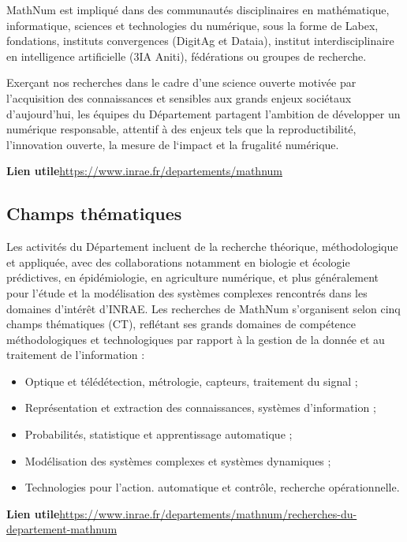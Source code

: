 MathNum est impliqu\'e dans des communaut\'es disciplinaires en math\'ematique, informatique, sciences et technologies du num\'erique, sous la forme de Labex, fondations, instituts convergences (DigitAg et Dataia), institut interdisciplinaire en intelligence artificielle (3IA Aniti), f\'ed\'erations ou groupes de recherche.

Exer\c{c}ant nos recherches dans le cadre d’une science ouverte motiv\'ee par l’acquisition des connaissances et sensibles aux grands enjeux soci\'etaux d’aujourd’hui, les \'equipes du D\'epartement partagent l’ambition de d\'evelopper un num\'erique responsable, attentif \`a des enjeux tels que la reproductibilit\'e, l’innovation ouverte, la mesure de l‘impact et la frugalit\'e num\'erique.

\textbf{Lien utile\hspace{.5em}}\url{https://www.inrae.fr/departements/mathnum}

\subsection{Champs th\'ematiques}

Les activit\'es du D\'epartement incluent de la recherche th\'eorique, m\'ethodologique et appliqu\'ee, avec des collaborations notamment en biologie et \'ecologie pr\'edictives, en \'epid\'emiologie, en agriculture num\'erique, et plus g\'en\'eralement pour l’\'etude et la mod\'elisation des syst\`emes complexes rencontr\'es dans les domaines d’int\'er\^et d’INRAE. Les recherches de MathNum s’organisent selon cinq champs th\'ematiques (CT), refl\'etant ses grands domaines de comp\'etence m\'ethodologiques et technologiques par rapport à la gestion de la donn\'ee et au traitement de l’information :
\begin{itemize}
\item Optique et t\'el\'ed\'etection, m\'etrologie, capteurs, traitement du signal ;
\item Repr\'esentation et extraction des connaissances, syst\`emes d'information ;
\item Probabilit\'es, statistique et apprentissage automatique ;
\item Mod\'elisation des syst\`emes complexes et syst\`emes dynamiques ;
\item Technologies pour l'action. automatique et contr\^ole, recherche op\'erationnelle.
\end{itemize}

\textbf{Lien utile\hspace{.5em}}\url{https://www.inrae.fr/departements/mathnum/recherches-du-departement-mathnum}

